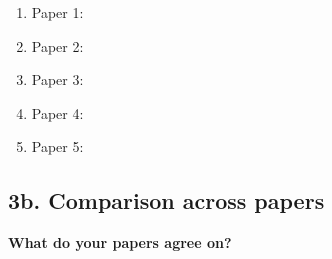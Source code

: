 \begin{enumerate}
  \item Paper 1: \underline{\hspace{11.5cm}} \\[4pt]
        \underline{\hspace{13cm}}
  \vspace{0.3cm}
  \item Paper 2: \underline{\hspace{11.5cm}} \\[4pt]
        \underline{\hspace{13cm}}
  \vspace{0.3cm}
  \item Paper 3: \underline{\hspace{11.5cm}} \\[4pt]
        \underline{\hspace{13cm}}
  \vspace{0.3cm}
  \item Paper 4: \underline{\hspace{11.5cm}} \\[4pt]
        \underline{\hspace{13cm}}
  \vspace{0.3cm}
  \item Paper 5: \underline{\hspace{11.5cm}} \\[4pt]
        \underline{\hspace{13cm}}
\end{enumerate}

\subsection*{3b. Comparison across papers}


\noindent\textbf{What do your papers agree on?}

\vspace{0.2cm}
\noindent\underline{\hspace{14cm}}

\vspace{0.3cm}
\noindent\underline{\hspace{14cm}}

\vspace{0.3cm}
\noindent\underline{\hspace{14cm}}

